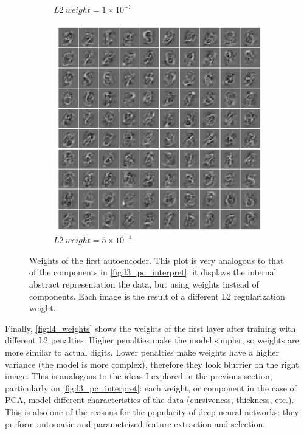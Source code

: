 \documentclass[a4paper, 10pt]{article}
\begin{document}
\begin{figure}[htb]
\begin{subfigure}[t]{0.245\linewidth}
      \caption{$L2\ weight = 1 \times 10^{-3}$}
    \end{subfigure}
    \hfill
    \begin{subfigure}[t]{0.25\linewidth}
      \includegraphics[width=1\linewidth]{lab4/weights_regulariz5e-4.png}
      \caption{$L2\ weight = 5 \times 10^{-4}$}
    \end{subfigure}
    \hfill \mbox{}
    \caption{Weights of the first autoencoder. This plot is very analogous
    to that of the components in \autoref{fig:l3_pc_interpret}: it displays
    the internal abstract representation the data, but using weights instead of 
    components.  
    Each image is the result of a different L2 regularization weight. }
    \label{fig:l4_weights}
  \end{figure}

  Finally, \autoref{fig:l4_weights} shows the weights of the first layer after
  training with different L2 penalties. Higher penalties make the model simpler,
  so weights are more similar to actual digits. Lower penalties make weights
  have a higher variance (the model is more complex), therefore they look
  blurrier on the right image. This
  is analogous to the ideas I explored in the previous section, particularly 
  on \autoref{fig:l3_pc_interpret}: each weight, or component in the case of 
  PCA, model different characteristics of the data (cursiveness, thickness, 
  etc.). This is also one of the reasons for the popularity of deep neural 
  networks: they perform automatic and parametrized feature extraction and 
  selection.
\end{document}
